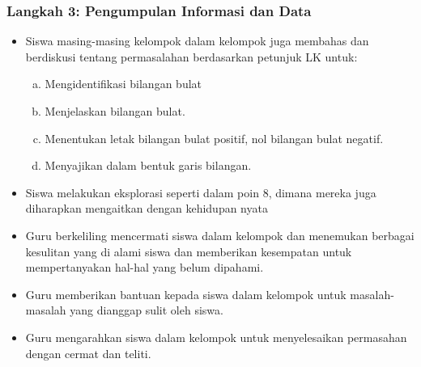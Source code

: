 \documentclass[a5paper,10pt,openany]{book}
\begin{document}
\subsubsection{Langkah 3: Pengumpulan Informasi dan Data}
{\color{NavyBlue}
	\begin{itemize}[\faCheckSquare,leftmargin=*,itemsep=-4pt,topsep=2pt]	
		\item Siswa masing-masing kelompok dalam kelompok juga membahas dan berdiskusi tentang permasalahan berdasarkan petunjuk LK untuk:
		\begin{enumerate}[a.,leftmargin=*,itemsep=-4pt,topsep=2pt]
		\item Mengidentifikasi bilangan bulat
		\item Menjelaskan bilangan bulat.
		\item Menentukan letak bilangan bulat positif, nol bilangan bulat negatif.
		\item Menyajikan dalam bentuk garis bilangan.
	\end{enumerate}
		\item Siswa melakukan eksplorasi seperti dalam poin 8, dimana mereka juga diharapkan mengaitkan dengan kehidupan nyata 
		\item Guru berkeliling mencermati siswa dalam kelompok dan menemukan berbagai kesulitan yang di alami siswa dan  memberikan kesempatan untuk mempertanyakan hal-hal yang belum dipahami.
		\item Guru memberikan bantuan kepada siswa dalam kelompok untuk masalah-masalah yang dianggap sulit oleh siswa.
		\item Guru mengarahkan siswa dalam kelompok untuk menyelesaikan permasahan dengan cermat dan teliti.	
	\end{itemize}	
}	
\end{document}

